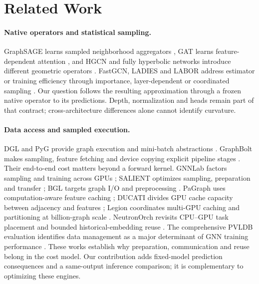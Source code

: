 \documentclass[sigconf, nonacm]{acmart}
\begin{document}
\section{Related Work}
\label{sec:scope}
\paragraph{Native operators and statistical sampling.}
GraphSAGE learns sampled neighborhood aggregators \cite{hamilton2017inductive}, GAT learns feature-dependent attention \cite{velickovic2018graph}, and HGCN and fully hyperbolic networks introduce different geometric operators \cite{chami2019hyperbolic,chen2022fully}. FastGCN, LADIES and LABOR address estimator or training efficiency through importance, layer-dependent or coordinated sampling \cite{chen2018fastgcn,zou2019ladies,balin2023labor}. Our question follows the resulting approximation through a frozen native operator to its predictions. Depth, normalization and heads remain part of that contract; cross-architecture differences alone cannot identify curvature.

\paragraph{Data access and sampled execution.}
DGL and PyG provide graph execution and mini-batch abstractions \cite{wang2019dgl,fey2019pyg}. GraphBolt makes sampling, feature fetching and device copying explicit pipeline stages \cite{dgl2024graphbolt}. Their end-to-end cost matters beyond a forward kernel. GNNLab factors sampling and training across GPUs \cite{yang2022gnnlab}; SALIENT optimizes sampling, preparation and transfer \cite{kaler2022salient}; BGL targets graph I/O and preprocessing \cite{liu2023bgl}. PaGraph uses computation-aware feature caching \cite{lin2020pagraph}; DUCATI divides GPU cache capacity between adjacency and features \cite{zhang2023ducati}; Legion coordinates multi-GPU caching and partitioning at billion-graph scale \cite{sun2023legion}. NeutronOrch revisits CPU--GPU task placement and bounded historical-embedding reuse \cite{ai2024neutronorch}. The comprehensive PVLDB evaluation identifies data management as a major determinant of GNN training performance \cite{yuan2024comprehensive}. These works establish why preparation, communication and reuse belong in the cost model. Our contribution adds fixed-model prediction consequences and a same-output inference comparison; it is complementary to optimizing these engines.
\end{document}
